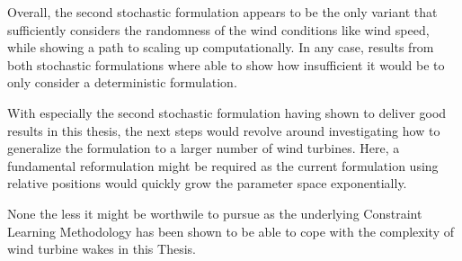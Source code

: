 \documentclass[preprint,12pt]{elsarticle}
\begin{document}
Overall, the second stochastic formulation appears to be the only variant that sufficiently considers the randomness of the wind conditions like wind speed, while showing a path to scaling up computationally. In any case, results from both stochastic formulations where able to show how insufficient it would be to only consider a deterministic formulation.

With especially the second stochastic formulation having shown to deliver good results in this thesis, the next steps would revolve around investigating how to generalize the formulation to a larger number of wind turbines. Here, a fundamental reformulation might be required as the current formulation using relative positions would quickly grow the parameter space exponentially. 

None the less it might be worthwile to pursue as the underlying Constraint Learning Methodology has been shown to be able to cope with the complexity of wind turbine wakes in this Thesis.
\end{document}
